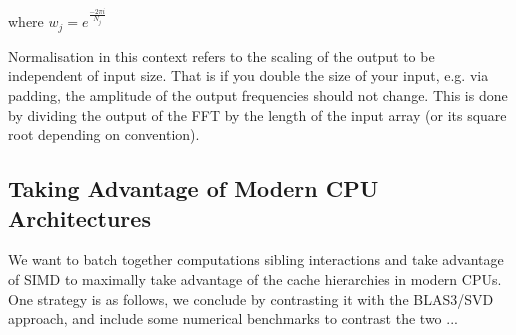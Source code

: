 \documentclass[12pt, a4, twoside]{article}
\begin{document}
where $w_j = e^{\frac{-2\pi i}{N_j}}$


Normalisation in this context refers to the scaling of the output to be independent of input size. That is if you double the size of your input, e.g. via padding, the amplitude of the output frequencies should not change. This is done by dividing the output of the FFT by the length of the input array (or its square root depending on convention).

\subsection{Taking Advantage of Modern CPU Architectures}

We want to batch together computations sibling interactions and take advantage of SIMD to maximally take advantage of the cache hierarchies in modern CPUs. One strategy is as follows, we conclude by contrasting it with the BLAS3/SVD approach, and include some numerical benchmarks to contrast the two ...


    
\printbibliography[heading=bibintoc]
\end{document}
